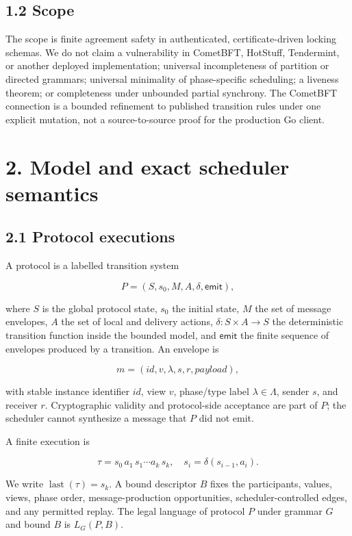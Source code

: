 \documentclass[10pt,a4paper]{article}
\begin{document}
\subsection{1.2 Scope}\label{scope}

The scope is finite agreement safety in authenticated,
certificate-driven locking schemas. We do not claim a vulnerability in
CometBFT, HotStuff, Tendermint, or another deployed implementation;
universal incompleteness of partition or directed grammars; universal
minimality of phase-specific scheduling; a liveness theorem; or
completeness under unbounded partial synchrony. The CometBFT connection
is a bounded refinement to published transition rules under one explicit
mutation, not a source-to-source proof for the production Go client.

\section{2. Model and exact scheduler
semantics}\label{model-and-exact-scheduler-semantics}

\subsection{2.1 Protocol executions}\label{protocol-executions}

A protocol is a labelled transition system

\[
P=(S,s_0,M,A,\delta,\mathsf{emit}),
\]

where \(S\) is the global protocol state, \(s_0\) the initial state,
\(M\) the set of message envelopes, \(A\) the set of local and delivery
actions, \(\delta:S\times A\to S\) the deterministic transition function
inside the bounded model, and \(\mathsf{emit}\) the finite sequence of
envelopes produced by a transition. An envelope is

\[
m=(\mathit{id},v,\lambda,s,r,\mathit{payload}),
\]

with stable instance identifier \(\mathit{id}\), view \(v\), phase/type
label \(\lambda\in\Lambda\), sender \(s\), and receiver \(r\).
Cryptographic validity and protocol-side acceptance are part of \(P\);
the scheduler cannot synthesize a message that \(P\) did not emit.

A finite execution is

\[
\tau=s_0\,a_1\,s_1\cdots a_k\,s_k,
\quad s_i=\delta(s_{i-1},a_i).
\]

We write \(\operatorname{last}(\tau)=s_k\). A bound descriptor \(B\)
fixes the participants, values, views, phase order, message-production
opportunities, scheduler-controlled edges, and any permitted replay. The
legal language of protocol \(P\) under grammar \(G\) and bound \(B\) is
\(L_G(P,B)\).
\end{document}
